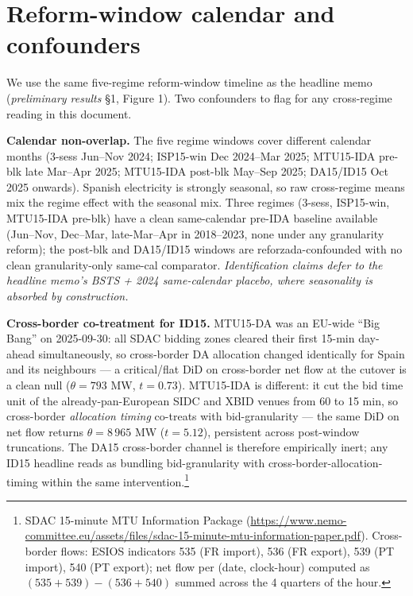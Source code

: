 \documentclass[11pt,a4paper]{article}
\begin{document}
\section*{Reform-window calendar and confounders}\label{sec:bid_internal:timeline}

\noindent We use the same five-regime reform-window timeline as the headline memo (\emph{preliminary results} \S 1, Figure 1). Two confounders to flag for any cross-regime reading in this document.

\textbf{Calendar non-overlap.} The five regime windows cover different calendar months (3-sess Jun--Nov 2024; ISP15-win Dec 2024--Mar 2025; MTU15-IDA pre-blk late Mar--Apr 2025; MTU15-IDA post-blk May--Sep 2025; DA15/ID15 Oct 2025 onwards). Spanish electricity is strongly seasonal, so raw cross-regime means mix the regime effect with the seasonal mix. Three regimes (3-sess, ISP15-win, MTU15-IDA pre-blk) have a clean same-calendar pre-IDA baseline available (Jun--Nov, Dec--Mar, late-Mar--Apr in 2018--2023, none under any granularity reform); the post-blk and DA15/ID15 windows are reforzada-confounded with no clean granularity-only same-cal comparator. \emph{Identification claims defer to the headline memo's BSTS + 2024 same-calendar placebo, where seasonality is absorbed by construction.}

\textbf{Cross-border co-treatment for ID15.} MTU15-DA was an EU-wide ``Big Bang'' on 2025-09-30: all SDAC bidding zones cleared their first 15-min day-ahead simultaneously, so cross-border DA allocation changed identically for Spain and its neighbours --- a critical/flat DiD on cross-border net flow at the cutover is a clean null ($\theta = 793$ MW, $t = 0.73$). MTU15-IDA is different: it cut the bid time unit of the already-pan-European SIDC and XBID venues from 60 to 15 min, so cross-border \emph{allocation timing} co-treats with bid-granularity --- the same DiD on net flow returns $\theta = 8\,965$ MW ($t = 5.12$), persistent across post-window truncations. The DA15 cross-border channel is therefore empirically inert; any ID15 headline reads as bundling bid-granularity with cross-border-allocation-timing within the same intervention.\footnote{SDAC 15-minute MTU Information Package (\url{https://www.nemo-committee.eu/assets/files/sdac-15-minute-mtu-information-paper.pdf}). Cross-border flows: ESIOS indicators 535 (FR import), 536 (FR export), 539 (PT import), 540 (PT export); net flow per (date, clock-hour) computed as $(535+539)-(536+540)$ summed across the 4 quarters of the hour.}
\end{document}
